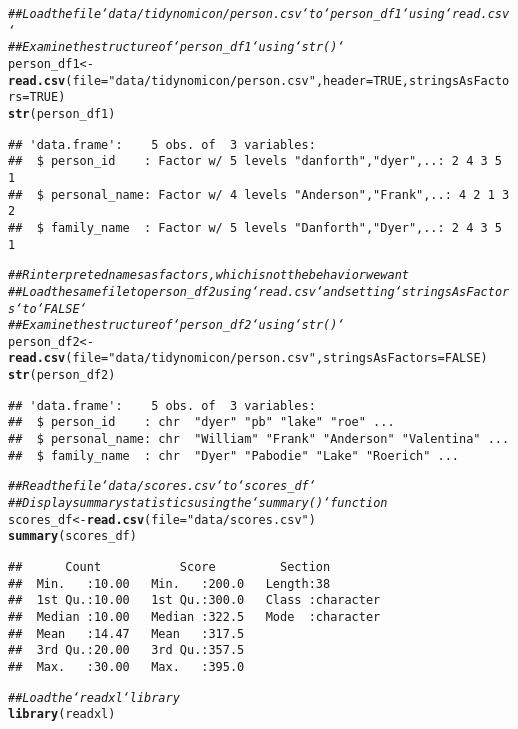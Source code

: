 \documentclass{article}\usepackage[]{graphicx}\usepackage[]{xcolor}
\makeatletter
\newcommand{\hlnum}[1]{\textcolor[rgb]{0.686,0.059,0.569}{#1}}%
\newcommand{\hlstr}[1]{\textcolor[rgb]{0.192,0.494,0.8}{#1}}%
\newcommand{\hlcom}[1]{\textcolor[rgb]{0.678,0.584,0.686}{\textit{#1}}}%
\newcommand{\hlstd}[1]{\textcolor[rgb]{0.345,0.345,0.345}{#1}}%
\newcommand{\hlkwb}[1]{\textcolor[rgb]{0.69,0.353,0.396}{#1}}%
\newcommand{\hlkwc}[1]{\textcolor[rgb]{0.333,0.667,0.333}{#1}}%
\newcommand{\hlkwd}[1]{\textcolor[rgb]{0.737,0.353,0.396}{\textbf{#1}}}%
\newenvironment{kframe}{%
 \def\at@end@of@kframe{}%
 \ifinner\ifhmode%
  \def\at@end@of@kframe{\end{minipage}}%
  \begin{minipage}{\columnwidth}%
 \fi\fi%
 \def\FrameCommand##1{\hskip\@totalleftmargin \hskip-\fboxsep
 \colorbox{shadecolor}{##1}\hskip-\fboxsep
     \hskip-\linewidth \hskip-\@totalleftmargin \hskip\columnwidth}%
 \MakeFramed {\advance\hsize-\width
   \@totalleftmargin\z@ \linewidth\hsize
   \@setminipage}}%
 {\par\unskip\endMakeFramed%
 \at@end@of@kframe}
\newenvironment{knitrout}{}{} %
\makeatother
\begin{document}
\begin{knitrout}
\begin{kframe}
\begin{alltt}
\hlcom{## Load the file `data/tidynomicon/person.csv` to `person_df1` using `read.csv`}
\hlcom{## Examine the structure of `person_df1` using `str()`}
\hlstd{person_df1} \hlkwb{<-} \hlkwd{read.csv}\hlstd{(}\hlkwc{file}\hlstd{=}\hlstr{"data/tidynomicon/person.csv"}\hlstd{,} \hlkwc{header} \hlstd{=} \hlnum{TRUE}\hlstd{,} \hlkwc{stringsAsFactors} \hlstd{=} \hlnum{TRUE}\hlstd{)}
\hlkwd{str}\hlstd{(person_df1)}
\end{alltt}
\begin{verbatim}
## 'data.frame':	5 obs. of  3 variables:
##  $ person_id    : Factor w/ 5 levels "danforth","dyer",..: 2 4 3 5 1
##  $ personal_name: Factor w/ 4 levels "Anderson","Frank",..: 4 2 1 3 2
##  $ family_name  : Factor w/ 5 levels "Danforth","Dyer",..: 2 4 3 5 1
\end{verbatim}
\begin{alltt}
\hlcom{## R interpreted names as factors, which is not the behavior we want}
\hlcom{## Load the same file to person_df2 using `read.csv` and setting `stringsAsFactors` to `FALSE`}
\hlcom{## Examine the structure of `person_df2` using `str()`}
\hlstd{person_df2} \hlkwb{<-} \hlkwd{read.csv}\hlstd{(}\hlkwc{file}\hlstd{=}\hlstr{"data/tidynomicon/person.csv"}\hlstd{,} \hlkwc{stringsAsFactors} \hlstd{=} \hlnum{FALSE}\hlstd{)}
\hlkwd{str}\hlstd{(person_df2)}
\end{alltt}
\begin{verbatim}
## 'data.frame':	5 obs. of  3 variables:
##  $ person_id    : chr  "dyer" "pb" "lake" "roe" ...
##  $ personal_name: chr  "William" "Frank" "Anderson" "Valentina" ...
##  $ family_name  : chr  "Dyer" "Pabodie" "Lake" "Roerich" ...
\end{verbatim}
\begin{alltt}
\hlcom{## Read the file `data/scores.csv` to `scores_df`}
\hlcom{## Display summary statistics using the `summary()` function}
\hlstd{scores_df} \hlkwb{<-} \hlkwd{read.csv}\hlstd{(}\hlkwc{file}\hlstd{=}\hlstr{"data/scores.csv"}\hlstd{)}
\hlkwd{summary}\hlstd{(scores_df)}
\end{alltt}
\begin{verbatim}
##      Count           Score         Section         
##  Min.   :10.00   Min.   :200.0   Length:38         
##  1st Qu.:10.00   1st Qu.:300.0   Class :character  
##  Median :10.00   Median :322.5   Mode  :character  
##  Mean   :14.47   Mean   :317.5                     
##  3rd Qu.:20.00   3rd Qu.:357.5                     
##  Max.   :30.00   Max.   :395.0
\end{verbatim}
\begin{alltt}
\hlcom{## Load the `readxl` library}
\hlkwd{library}\hlstd{(readxl)}


\end{alltt}
\end{kframe}
\end{knitrout}
\end{document}
